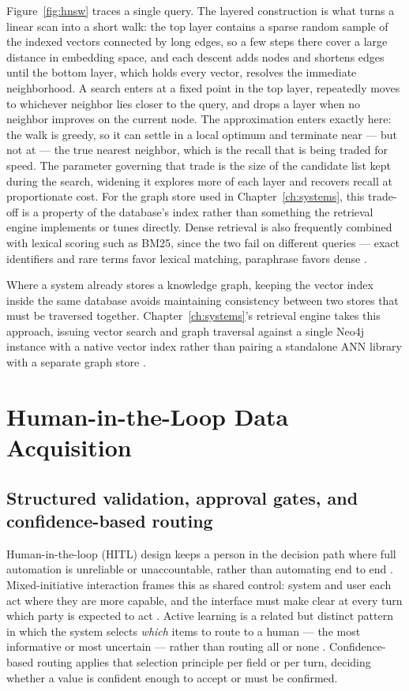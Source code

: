 Figure~\ref{fig:hnsw} traces a single query. The layered construction is what turns a linear scan into a short walk: the top layer contains a sparse random sample of the indexed vectors connected by long edges, so a few steps there cover a large distance in embedding space, and each descent adds nodes and shortens edges until the bottom layer, which holds every vector, resolves the immediate neighborhood. A search enters at a fixed point in the top layer, repeatedly moves to whichever neighbor lies closer to the query, and drops a layer when no neighbor improves on the current node. The approximation enters exactly here: the walk is greedy, so it can settle in a local optimum and terminate near --- but not at --- the true nearest neighbor, which is the recall that is being traded for speed. The parameter governing that trade is the size of the candidate list kept during the search, widening it explores more of each layer and recovers recall at proportionate cost. For the graph store used in Chapter~\ref{ch:systems}, this trade-off is a property of the database's index rather than something the retrieval engine implements or tunes directly. Dense retrieval is also frequently combined with lexical scoring such as BM25, since the two fail on different queries — exact identifiers and rare terms favor lexical matching, paraphrase favors dense \citep{robertson2009probabilistic}.

Where a system already stores a knowledge graph, keeping the vector index inside the same database avoids maintaining consistency between two stores that must be traversed together. Chapter~\ref{ch:systems}'s retrieval engine takes this approach, issuing vector search and graph traversal against a single Neo4j instance with a native vector index rather than pairing a standalone ANN library with a separate graph store \citep{neo4j2026neo4j}.

\section{Human-in-the-Loop Data Acquisition}
\label{sec:hitl}

\subsection{Structured validation, approval gates, and confidence-based routing}
\label{sec:hitl-validation}

Human-in-the-loop (HITL) design keeps a person in the decision path where full automation is unreliable or unaccountable, rather than automating end to end \citep{amershi2014power}. Mixed-initiative interaction frames this as shared control: system and user each act where they are more capable, and the interface must make clear at every turn which party is expected to act \citep{horvitz1999principles}. Active learning is a related but distinct pattern in which the system selects \emph{which} items to route to a human — the most informative or most uncertain — rather than routing all or none \citep{settles2009active}. Confidence-based routing applies that selection principle per field or per turn, deciding whether a value is confident enough to accept or must be confirmed.


